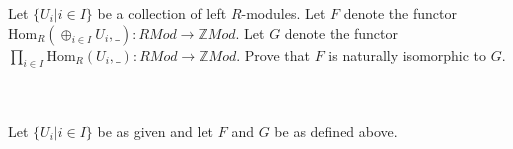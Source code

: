 Let $\{U_i|i\in I\}$ be a collection of left $R$-modules. Let $F$ denote the functor
$\text{Hom}_R(\oplus_{i\in I}U_i,\_):RMod\to \mathbb{Z}Mod$. Let $G$ denote the functor
$\prod_{i\in I}\text{Hom}_R(U_i,\_):RMod\to \mathbb{Z}Mod$. Prove that $F$ is naturally isomorphic to
$G$.\\\\

\begin{solution}\renewcommand{\qedsymbol}{}\ \\
    Let $\{U_i|i\in I\}$ be as given and let $F$ and $G$ be as defined above.
\end{solution}